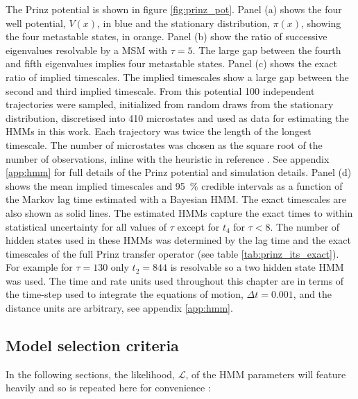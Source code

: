 The Prinz potential \cite{prinzMarkovModelsMolecular2011} is shown in figure \ref{fig:prinz_pot}.  Panel (a) shows the four well potential, $V(x)$, in blue and the stationary distribution, $\pi(x)$, showing the four metastable states, in orange. Panel (b) show the  ratio of successive eigenvalues resolvable by a  MSM with $\tau=5$. The large gap between the fourth and fifth eigenvalues implies four metastable states. Panel (c) shows the exact ratio of implied timescales. The implied timescales show a large gap between the second and third implied timescale. From this potential \num{100} independent trajectories were sampled, initialized from random draws from the stationary distribution, discretised into \num{410} microstates and used as data for estimating the HMMs in this work. Each trajectory was twice the length of the longest timescale. The number of microstates was chosen as the square root of the number of observations, inline with the heuristic in reference \cite{husicWardClusteringImproves2017a}. See appendix \ref{app:hmm} for full details of the Prinz potential and simulation details. Panel (d) shows the mean implied timescales and \SI{95}{\percent} credible intervals as a function of the Markov lag time estimated with a Bayesian HMM. The exact timescales are also shown as solid lines. The estimated HMMs capture the exact times to within statistical uncertainty for all values of $\tau$ except for $t_{4}$ for $\tau < 8$. The number of hidden states used in these HMMs was determined by the lag time and the exact timescales of the full Prinz transfer operator (see table \ref{tab:prinz_its_exact}). For example for $\tau = 130$ only $t_2 = 844$ is resolvable so a two hidden state HMM was used. The time and rate units used throughout this chapter are in terms of the time-step used to integrate the equations of motion, $\Delta t = 0.001$, and the distance units are arbitrary, see appendix \ref{app:hmm}.

\subsection{Model selection criteria}

In the following sections, the likelihood, $\mathcal{L}$, of the HMM parameters will feature heavily and so is repeated here for convenience \cite{noeProjectedHiddenMarkov2013a}: 

